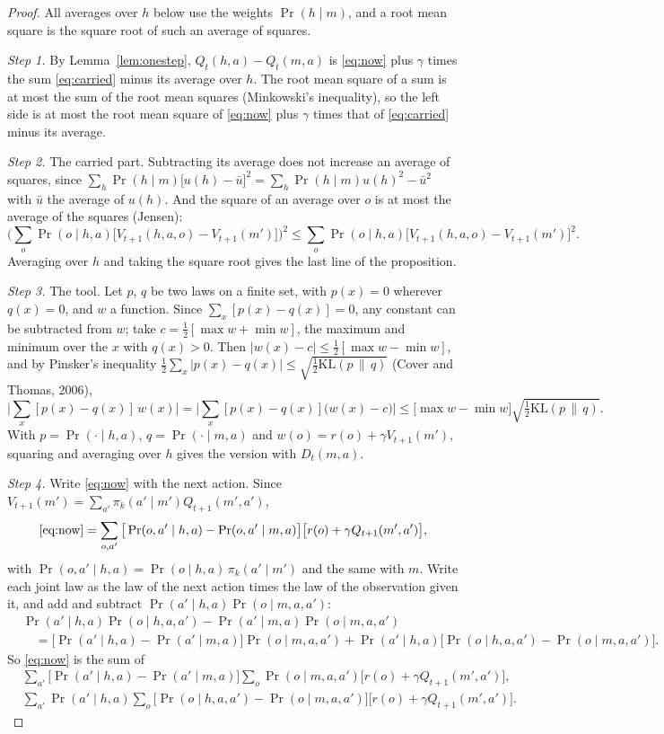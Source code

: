 \documentclass[11pt]{article}
\theoremstyle{definition}
\newcommand{\KL}{\mathrm{KL}}
\begin{document}
\begin{proof}
All averages over $h$ below use the weights $\Pr(h\mid m)$, and a root mean square is the square root of such an average of squares.

\emph{Step 1.} By Lemma~\ref{lem:onestep}, $Q_t(h,a)-Q_t(m,a)$ is \eqref{eq:now} plus $\gamma$ times the sum \eqref{eq:carried} minus its average over $h$. The root mean square of a sum is at most the sum of the root mean squares (Minkowski's inequality), so the left side is at most the root mean square of \eqref{eq:now} plus $\gamma$ times that of \eqref{eq:carried} minus its average.

\emph{Step 2.} The carried part. Subtracting its average does not increase an average of squares, since $\sum_h\Pr(h\mid m)\big[u(h)-\bar u\big]^2=\sum_h\Pr(h\mid m)u(h)^2-\bar u^2$ with $\bar u$ the average of $u(h)$. And the square of an average over $o$ is at most the average of the squares (Jensen):
\[
\Big(\sum_o\Pr(o\mid h,a)\big[V_{t+1}(h,a,o)-V_{t+1}(m')\big]\Big)^2\le\sum_o\Pr(o\mid h,a)\big[V_{t+1}(h,a,o)-V_{t+1}(m')\big]^2.
\]
Averaging over $h$ and taking the square root gives the last line of the proposition.

\emph{Step 3.} The tool. Let $p$, $q$ be two laws on a finite set, with $p(x)=0$ wherever $q(x)=0$, and $w$ a function. Since $\sum_x[p(x)-q(x)]=0$, any constant can be subtracted from $w$; take $c=\tfrac12[\max w+\min w]$, the maximum and minimum over the $x$ with $q(x)>0$. Then $|w(x)-c|\le\tfrac12[\max w-\min w]$, and by Pinsker's inequality $\tfrac12\sum_x|p(x)-q(x)|\le\sqrt{\tfrac12\KL(p\,\|\,q)}$ (Cover and Thomas, 2006),
\[
\Big|\sum_x[p(x)-q(x)]\,w(x)\Big|=\Big|\sum_x[p(x)-q(x)]\big(w(x)-c\big)\Big|\le\big[\max w-\min w\big]\sqrt{\tfrac12\KL(p\,\|\,q)} .
\]
With $p=\Pr(\cdot\mid h,a)$, $q=\Pr(\cdot\mid m,a)$ and $w(o)=r(o)+\gamma V_{t+1}(m')$, squaring and averaging over $h$ gives the version with $D_t(m,a)$.

\emph{Step 4.} Write \eqref{eq:now} with the next action. Since $V_{t+1}(m')=\sum_{a'}\pi_k(a'\mid m')Q_{t+1}(m',a')$,
\[
\eqref{eq:now}=\sum_{o,a'}\big[\Pr(o,a'\mid h,a)-\Pr(o,a'\mid m,a)\big]\big[r(o)+\gamma Q_{t+1}(m',a')\big],
\]
with $\Pr(o,a'\mid h,a)=\Pr(o\mid h,a)\,\pi_k(a'\mid m')$ and the same with $m$. Write each joint law as the law of the next action times the law of the observation given it, and add and subtract $\Pr(a'\mid h,a)\Pr(o\mid m,a,a')$:
\begin{align*}
&\Pr(a'\mid h,a)\Pr(o\mid h,a,a')-\Pr(a'\mid m,a)\Pr(o\mid m,a,a')\\
&\quad=\big[\Pr(a'\mid h,a)-\Pr(a'\mid m,a)\big]\Pr(o\mid m,a,a')+\Pr(a'\mid h,a)\big[\Pr(o\mid h,a,a')-\Pr(o\mid m,a,a')\big].
\end{align*}
So \eqref{eq:now} is the sum of
\begin{align}
&\sum_{a'}\big[\Pr(a'\mid h,a)-\Pr(a'\mid m,a)\big]\sum_o\Pr(o\mid m,a,a')\big[r(o)+\gamma Q_{t+1}(m',a')\big], \label{eq:viaA}\\
&\sum_{a'}\Pr(a'\mid h,a)\sum_o\big[\Pr(o\mid h,a,a')-\Pr(o\mid m,a,a')\big]\big[r(o)+\gamma Q_{t+1}(m',a')\big]. \label{eq:viaO}
\end{align}


\end{proof}
\end{document}
